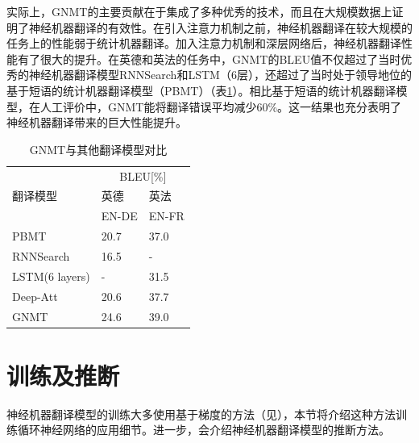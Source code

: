 \parinterval 实际上，GNMT的主要贡献在于集成了多种优秀的技术，而且在大规模数据上证明了神经机器翻译的有效性。在引入注意力机制之前，神经机器翻译在较大规模的任务上的性能弱于统计机器翻译。加入注意力机制和深层网络后，神经机器翻译性能有了很大的提升。在英德和英法的任务中，GNMT的BLEU值不仅超过了当时优秀的神经机器翻译模型RNNSearch和LSTM（6层），还超过了当时处于领导地位的基于短语的统计机器翻译模型（PBMT）（表\ref{tab:10-8}）。相比基于短语的统计机器翻译模型，在人工评价中，GNMT能将翻译错误平均减少60\%。这一结果也充分表明了神经机器翻译带来的巨大性能提升。

\begin{table}[htp]
\centering
\caption{GNMT与其他翻译模型对比}
\label{tab:10-8}
\begin{tabular}{l l l}
\multicolumn{1}{l|}{\multirow{3}{*}{翻译模型}} & \multicolumn{2}{c}{BLEU[\%]} \\
\multicolumn{1}{l|}{}                    & 英德  & 英法                                               \\
\multicolumn{1}{l|}{}                    & EN-DE  & EN-FR                                               \\ \hline
\multicolumn{1}{l|}{PBMT}                & 20.7            & 37.0            \\
\multicolumn{1}{l|}{RNNSearch}           & 16.5            & -               \\
\multicolumn{1}{l|}{LSTM(6 layers)}      & -               & 31.5            \\
\multicolumn{1}{l|}{Deep-Att}            & 20.6            & 37.7            \\
\multicolumn{1}{l|}{GNMT}                & 24.6            & 39.0            \\
\end{tabular}
\end{table}

\sectionnewpage
\section{训练及推断}

神经机器翻译模型的训练大多使用基于梯度的方法（见{\chapternine}），本节将介绍这种方法训练循环神经网络的应用细节。进一步，会介绍神经机器翻译模型的推断方法。

